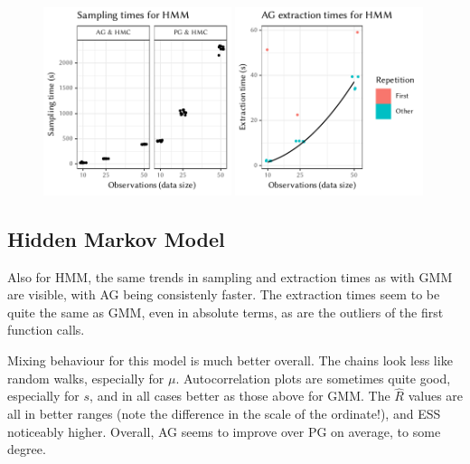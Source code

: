 \cleartoverso
\FloatBlock

\begin{figure}[t!]
  \centering
    \includegraphics[width=0.49\textwidth]{figures/HMM-sampling_times}
  \includegraphics[width=0.49\textwidth]{figures/HMM-compile_times}
  \caption{}
  \label{fig:plots-hmm}
\end{figure}

\subsection*{Hidden Markov Model}

Also for HMM, the same trends in sampling and extraction times as with GMM are visible, with AG
being consistenly faster.  The extraction times seem to be quite the same as GMM, even in absolute
terms, as are the outliers of the first function calls.

Mixing behaviour for this model is much better overall.  The chains look less like random walks,
especially for \(\mu\).  Autocorrelation plots are sometimes quite good, especially for \(s\), and
in all cases better as those above for GMM.  The \(\widehat{R}\) values are all in better ranges
(note the difference in the scale of the ordinate!), and ESS noticeably higher.  Overall, AG seems
to improve over PG on average, to some degree.

